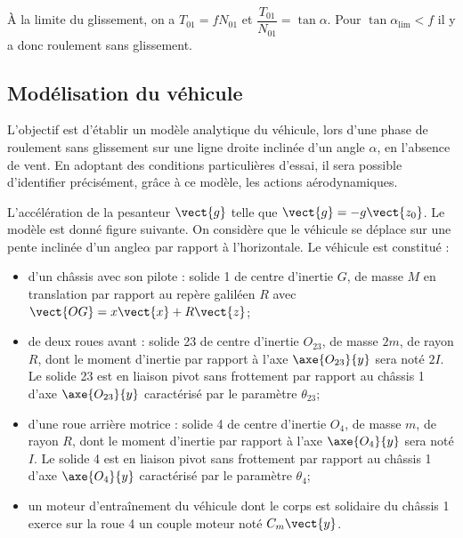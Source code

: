 \begin{multicols}{2}
\ifprof
\begin{corrige}
À la limite du glissement, on a $T_{01}=fN_{01}$ et $\dfrac{T_{01}}{N_{01}}=\tan\alpha$. Pour $\tan \alpha_{\text{lim}}<f$ il y a donc roulement sans glissement. 
\end{corrige}
\else
\fi
\subsection*{Modélisation du véhicule}

\ifprof
\else

L’objectif est d’établir un modèle analytique du véhicule, lors d’une phase de roulement sans glissement sur une ligne droite inclinée d’un angle $\alpha$, en l’absence de vent. En adoptant des conditions particulières d’essai, il sera possible d’identifier précisément, grâce à ce modèle, les actions aérodynamiques. 

L’accélération de la pesanteur $\vect{g}$ telle que $\vect{g}=-g\vect{z_0}$. Le modèle est donné figure suivante. On considère que le véhicule se déplace sur une pente inclinée d’un angle$\alpha$ par rapport à l’horizontale. Le véhicule est constitué :
\begin{itemize}
\item d’un châssis avec son pilote : solide 1 de centre d’inertie $G$, de masse $M$ en translation par rapport au repère galiléen $R$ avec $\vect{OG}=x\vect{x}+R\vect{z}$;
\item de deux roues avant : solide 23 de centre d’inertie $O_{23}$, de masse $2 m$, de rayon $R$, dont le moment d’inertie par rapport à l’axe $\axe{O_{23}}{{y}}$ sera noté $2I$. Le solide 23 est en liaison pivot sans frottement par rapport au châssis 1 d’axe $\axe{O_{23}}{{y}}$ caractérisé par le paramètre $\theta_{23}$;
\item d’une roue arrière motrice : solide 4 de centre d’inertie $O_4$, de masse $m$, de rayon $R$, dont le moment d’inertie par rapport à l’axe $\axe{O_{4}}{{y}}$ sera noté $I$. Le solide 4 est en liaison pivot sans frottement par rapport au châssis 1 d’axe $\axe{O_{4}}{{y}}$ caractérisé par le paramètre $\theta_4$; 
\item un moteur d’entraînement du véhicule dont le corps est solidaire du châssis 1 exerce sur la roue 4 un couple moteur noté $C_m \vect{y}$. 
\end{itemize}


\end{multicols}
